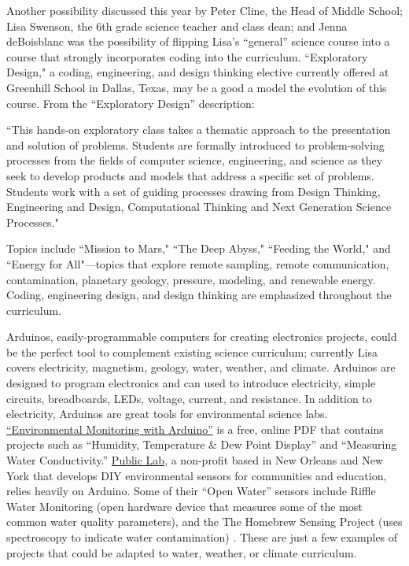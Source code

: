 Another possibility discussed this year by Peter Cline, the Head of Middle School; Lisa Swenson, the 6th grade science teacher and class dean; and Jenna deBoisblanc was the possibility of flipping Lisa's ``general'' science course into a course that strongly incorporates coding into the curriculum. ``Exploratory Design," a coding, engineering, and design thinking elective currently offered at Greenhill School in Dallas, Texas, may be a good a model the evolution of this course. From the ``Exploratory Design'' description:
\begin{blockquote} 
``This hands-on exploratory class takes a thematic approach to the presentation and solution of problems. Students are formally introduced to problem-solving processes from the fields of computer science, engineering, and science as they seek to develop products and models that address a specific set of problems. Students work with a set of guiding processes drawing from Design Thinking, Engineering and Design, Computational Thinking and Next Generation Science Processes."
\end{blockquote}
Topics include ``Mission to Mars," ``The Deep Abyss," ``Feeding the World," and ``Energy for All"---topics that explore remote sampling, remote communication, contamination, planetary geology, pressure, modeling, and renewable energy. Coding, engineering design, and design thinking are emphasized throughout the curriculum.\par
Arduinos, easily-programmable computers for creating electronics projects, could be the perfect tool to complement existing science curriculum; currently Lisa covers electricity, magnetism, geology, water, weather, and climate. Arduinos are designed to program electronics and can used to introduce electricity, simple circuits, breadboards, LEDs, voltage, current, and resistance. In addition to electricity, Arduinos are great tools for environmental science labs. \href{https://alejandroquinteros.files.wordpress.com/2012/11/environmental-monitoring-with-arduino.pdf}{``Environmental Monitoring with Arduino''} is a free, online PDF that contains projects such as ``Humidity, Temperature \& Dew Point Display'' and ``Measuring Water Conductivity.'' \href{https://publiclab.org/}{Public Lab}, a non-profit based in New Orleans and New York that develops DIY environmental sensors for communities and education, relies heavily on Arduino. Some of their ``Open Water'' sensors include Riffle Water Monitoring (open hardware device that measures some of the most common water quality parameters), and the The Homebrew Sensing Project (uses spectroscopy to indicate water contamination) \cite{publab}. These are just a few examples of projects that could be adapted to water, weather, or climate curriculum. \par 

